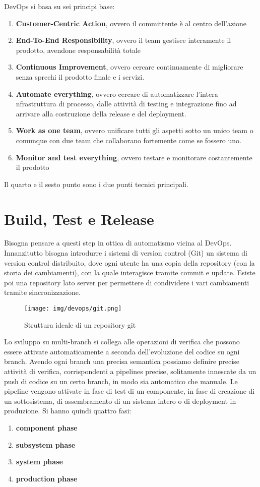 DevOps si basa su sei principi base:
\begin{enumerate}
    \item \textbf{Customer-Centric Action}, ovvero il committente è al centro
          dell'azione
    \item \textbf{End-To-End Responsibility}, ovvero il team gestisce interamente
          il prodotto, avendone responsabilità totale
    \item \textbf{Continuous Improvement}, ovvero cercare continuamente di
          migliorare senza sprechi il prodotto finale e i servizi.
    \item \textbf{Automate everything}, ovvero cercare di automatizzare l'intera
          nfrastruttura di processo, dalle attività di testing e integrazione fino ad
          arrivare alla costruzione della release e del deployment.
    \item \textbf{Work as one team}, ovvero unificare tutti gli aspetti sotto un
          unico team o comunque con due team che collaborano fortemente come se fossero uno.
    \item \textbf{Monitor and test everything}, ovvero testare e monitorare
          costantemente il prodotto
\end{enumerate}

Il quarto e il sesto punto sono i due punti tecnici principali.
\section{Build, Test e Release}
Bisogna pensare a questi step in ottica di automatismo vicina al DevOps.
Innanzitutto bisogna introdurre i sistemi di version control (Git) un sistema di
version control distribuito, dove ogni utente ha una copia della repository
(con la storia dei cambiamenti), con la quale interagisce tramite commit e update.
Esiste poi una repository lato server per permettere di condividere i vari
cambiamenti tramite sincronizzazione.

\begin{figure}[!ht]
    \centering
    \texttt{[image: img/devops/git.png]}
    \caption{Struttura ideale di un repository git}
    \label{fig:git}
\end{figure}

Lo sviluppo su multi-branch si collega alle operazioni di verifica che possono
essere attivate automaticamente a seconda dell'evoluzione del codice su ogni branch.
Avendo ogni branch una precisa semantica possiamo definire precise attività di
verifica, corrispondenti a pipelines precise, solitamente innescate da un push di
codice su un certo branch, in modo sia automatico che manuale.
Le pipeline vengono attivate in fase di test di un componente, in fase di creazione
di un sottosistema, di assembramento di un sistema intero o di deployment in
produzione. Si hanno quindi quattro fasi:
\begin{enumerate}
    \item \textbf{component phase}
    \item \textbf{subsystem phase}
    \item \textbf{system phase}
    \item \textbf{production phase}
\end{enumerate}

